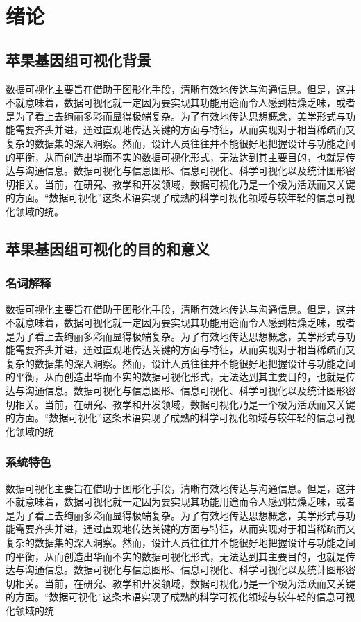 \chapter{绪论}
	\section{苹果基因组可视化背景}
	数据可视化主要旨在借助于图形化手段，清晰有效地传达与沟通信息。但是，这并不就意味着，数据可视化就一定因为要实现其功能用途而令人感到枯燥乏味，或者是为了看上去绚丽多彩而显得极端复杂。为了有效地传达思想概念，美学形式与功能需要齐头并进，通过直观地传达关键的方面与特征，从而实现对于相当稀疏而又复杂的数据集的深入洞察。然而，设计人员往往并不能很好地把握设计与功能之间的平衡，从而创造出华而不实的数据可视化形式，无法达到其主要目的，也就是传达与沟通信息。数据可视化与信息图形、信息可视化、科学可视化以及统计图形密切相关。当前，在研究、教学和开发领域，数据可视化乃是一个极为活跃而又关键的方面。“数据可视化”这条术语实现了成熟的科学可视化领域与较年轻的信息可视化领域的统。
	\section{苹果基因组可视化的目的和意义}
		\subsection{名词解释}
		数据可视化主要旨在借助于图形化手段，清晰有效地传达与沟通信息。但是，这并不就意味着，数据可视化就一定因为要实现其功能用途而令人感到枯燥乏味，或者是为了看上去绚丽多彩而显得极端复杂。为了有效地传达思想概念，美学形式与功能需要齐头并进，通过直观地传达关键的方面与特征，从而实现对于相当稀疏而又复杂的数据集的深入洞察。然而，设计人员往往并不能很好地把握设计与功能之间的平衡，从而创造出华而不实的数据可视化形式，无法达到其主要目的，也就是传达与沟通信息。数据可视化与信息图形、信息可视化、科学可视化以及统计图形密切相关。当前，在研究、教学和开发领域，数据可视化乃是一个极为活跃而又关键的方面。“数据可视化”这条术语实现了成熟的科学可视化领域与较年轻的信息可视化领域的统
		\subsection{系统特色}
		数据可视化主要旨在借助于图形化手段，清晰有效地传达与沟通信息。但是，这并不就意味着，数据可视化就一定因为要实现其功能用途而令人感到枯燥乏味，或者是为了看上去绚丽多彩而显得极端复杂。为了有效地传达思想概念，美学形式与功能需要齐头并进，通过直观地传达关键的方面与特征，从而实现对于相当稀疏而又复杂的数据集的深入洞察。然而，设计人员往往并不能很好地把握设计与功能之间的平衡，从而创造出华而不实的数据可视化形式，无法达到其主要目的，也就是传达与沟通信息。数据可视化与信息图形、信息可视化、科学可视化以及统计图形密切相关。当前，在研究、教学和开发领域，数据可视化乃是一个极为活跃而又关键的方面。“数据可视化”这条术语实现了成熟的科学可视化领域与较年轻的信息可视化领域的统
		
